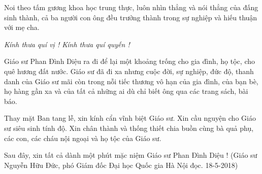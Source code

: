 Noi theo tấm gương khoa học trung thực, luôn nhìn thẳng và nói thẳng của đấng sinh thành, cả ba người con ông đều trưởng thành trong sự nghiệp và hiếu thuận với mẹ cha. 

{\em Kính thưa quí vị ! Kính thưa quí quyến !}

Giáo sư Phan Đình Diệu ra đi để lại một khoảng trống cho gia đình, họ tộc, cho quê hương đất nước. Giáo sư đã đi xa nhưng cuộc đời, sự nghiệp, đức độ, thanh danh của Giáo sư mãi còn trong nỗi tiếc thương vô hạn của gia đình, của bạn bè, họ hàng gần xa và của tất cả những ai dù chỉ biết ông qua các trang sách, bài báo. 

Thay mặt Ban tang lễ, xin kính cẩn vĩnh biệt Giáo sư. Xin cầu nguyện cho Giáo sư siêu sinh tính độ. Xin chân thành và thống thiết chia buồn cùng bà quả phụ, các con, các cháu nội ngoại và họ tộc của Giáo sư.

Sau đây, xin tất cả dành một phút mặc niệm Giáo sư Phan Đình Diệu !
(Giáo sư Nguyễn Hữu Đức, phó Giám đốc Đại học Quốc gia Hà Nội đọc. 18-5-2018)
